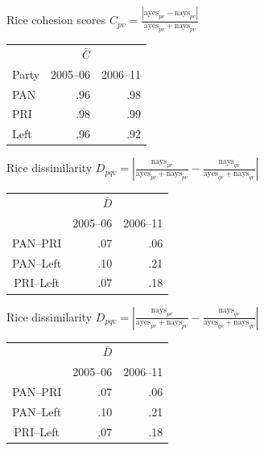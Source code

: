 \documentclass[bigger]{beamer}
\begin{document}
\begin{frame}[label={sec:org2c8b96c}]{Rice cohesion scores}
\centering
\(C_{pv} = \frac{\left|\text{ayes}_{pv} - \text{nays}_{pv}\right|}{\text{ayes}_{pv} + \text{nays}_{pv}}\)
\bigskip
\begin{center}
\begin{tabular}{lrr}
 & \(\bar{C}\) & \\
Party & 2005--06 & 2006--11\\
\hline
PAN & .96 & .98\\
PRI & .98 & .99\\
Left & .96 & .92\\
\end{tabular}
\end{center}
\end{frame}
\begin{frame}[label={sec:org579633f}]{Rice dissimilarity}
\centering
\(D_{pqv} = \left|\frac{\text{nays}_{pv}}{\text{ayes}_{pv} + \text{nays}_{pv}} - \frac{\text{nays}_{qv}}{\text{ayes}_{qv} + \text{nays}_{qv}}\right|\)

\bigskip
\begin{center}
\begin{tabular}{crr}
 & \(\bar{D}\) & \\
 & 2005--06 & 2006--11\\
\hline
PAN--PRI & .07 & .06\\
PAN--Left & .10 & .21\\
PRI--Left & .07 & .18\\
\end{tabular}
\end{center}
\end{frame}
\begin{frame}[label={sec:orgc4b5395}]{Rice dissimilarity}
\centering
\(D_{pqv} = \left|\frac{\text{nays}_{pv}}{\text{ayes}_{pv} + \text{nays}_{pv}} - \frac{\text{nays}_{qv}}{\text{ayes}_{qv} + \text{nays}_{qv}}\right|\)

\bigskip
\begin{center}
\begin{tabular}{crr}
 & \(\bar{D}\) & \\
 & 2005--06 & 2006--11\\
\hline
PAN--PRI & .07 & \alert{.06}\\
PAN--Left & .10 & \alert{.21}\\
PRI--Left & .07 & \alert{.18}\\
\end{tabular}
\end{center}
\end{frame}
\end{document}
